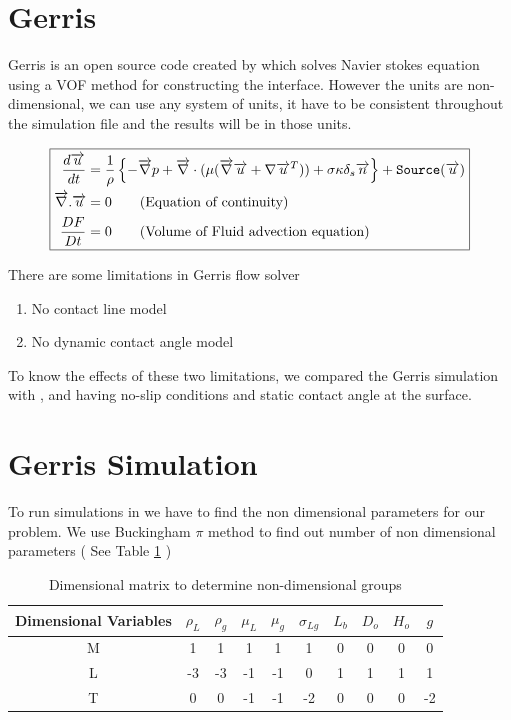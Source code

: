 \section{Gerris}
Gerris is an open source code created by \cite{Popinet2003} which solves Navier stokes equation using a VOF method for constructing the interface.
However the units are non-dimensional, we can use any system of units, it have to be consistent throughout
the simulation file and the results will be in those units.

\begin{equation}
 \boxed{ \begin{align}
 \frac{d \overrightarrow u}{dt} &= \frac{1}{\rho} \left\{ - \overrightarrow \nabla p + \overrightarrow \nabla \cdot ( \mu (\overrightarrow \nabla \overrightarrow u + \nabla \overrightarrow u^T )) + \sigma \kappa \delta_s \overrightarrow n \right\} + { {\tt Source} }(\overrightarrow u)\\
 \overrightarrow \nabla . \overrightarrow u &= 0 \qquad\text{(Equation of continuity)}\\
\frac{DF}{Dt}&=0 \qquad\text{(Volume of Fluid advection equation)}
\end{align} }
\label{Eq:gerris}
\end{equation}

There are some limitations in Gerris flow solver
\begin{enumerate}
 \item No contact line model
 \item No dynamic contact angle model
\end{enumerate}

To know the effects of these two limitations, we compared the Gerris simulation with \cite{Hung2011}, \cite{Clanet2004} and \cite{Wang2007}
having no-slip conditions and static contact angle at the surface.
\section{Gerris Simulation}
To run simulations in we have to find the non dimensional parameters for our problem.
We use Buckingham $\pi$ method to find out number of non dimensional parameters ( See Table \ref{table:bp} )
\begin{table}
  \begin{center}
    \caption{Dimensional matrix to determine non-dimensional groups}
    \label{table:bp}
      \begin{tabular}{c c c c c c c c c c}
	\toprule
	Dimensional Variables & $\rho_L$ & $\rho_g$ & $\mu_L$ & $\mu_g$ & $\sigma_{Lg}$ & $L_b$ & $D_o$ & $H_o$ & $g$ \\
	\midrule
	M & 1 & 1 & 1 & 1 & 1 & 0 & 0 & 0 & 0 \\
	L & -3 & -3 & -1 & -1 & 0 & 1 & 1 & 1 & 1 \\
	T & 0 & 0 & -1 & -1& -2 & 0 & 0 & 0 & -2 \\
	\bottomrule
      \end{tabular}
     \end{center}
 \end{table}

